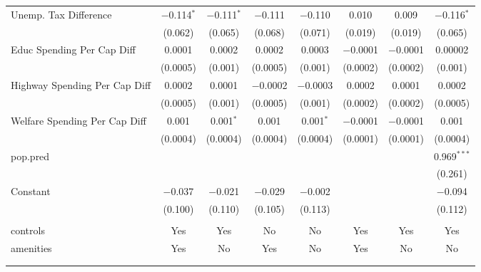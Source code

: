\begin{table}[!htbp]
\begin{tabular}{@{\extracolsep{5pt}}lccccccc}
  Unemp. Tax Difference & $-$0.114$^{*}$ & $-$0.111$^{*}$ & $-$0.111 & $-$0.110 & 0.010 & 0.009 & $-$0.116$^{*}$ \\ 
  & (0.062) & (0.065) & (0.068) & (0.071) & (0.019) & (0.019) & (0.065) \\ 
  Educ Spending Per Cap Diff & 0.0001 & 0.0002 & 0.0002 & 0.0003 & $-$0.0001 & $-$0.0001 & 0.00002 \\ 
  & (0.0005) & (0.001) & (0.0005) & (0.001) & (0.0002) & (0.0002) & (0.001) \\ 
  Highway Spending Per Cap Diff & 0.0002 & 0.0001 & $-$0.0002 & $-$0.0003 & 0.0002 & 0.0001 & 0.0002 \\ 
  & (0.0005) & (0.001) & (0.0005) & (0.001) & (0.0002) & (0.0002) & (0.0005) \\ 
  Welfare Spending Per Cap Diff & 0.001 & 0.001$^{*}$ & 0.001 & 0.001$^{*}$ & $-$0.0001 & $-$0.0001 & 0.001 \\ 
  & (0.0004) & (0.0004) & (0.0004) & (0.0004) & (0.0001) & (0.0001) & (0.0004) \\ 
  pop.pred &  &  &  &  &  &  & 0.969$^{***}$ \\ 
  &  &  &  &  &  &  & (0.261) \\ 
  Constant & $-$0.037 & $-$0.021 & $-$0.029 & $-$0.002 &  &  & $-$0.094 \\ 
  & (0.100) & (0.110) & (0.105) & (0.113) &  &  & (0.112) \\ 
 \hline \\[-1.8ex] 
controls & Yes & Yes & No & No & Yes & Yes & Yes \\ 
amenities & Yes & No & Yes & No & Yes & No & No \\ 
\hline \\[-1.8ex] 
\hline 
\hline \\[-1.8ex] 
\end{tabular} 
\end{table} 
